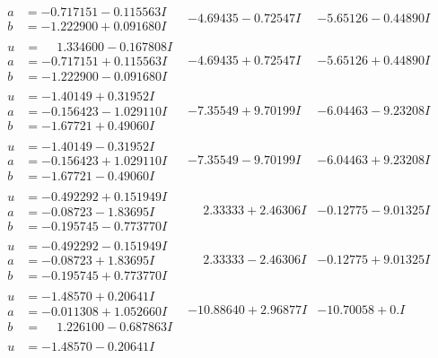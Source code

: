 \documentclass[1p]{elsarticle_modified}
\theoremstyle{definition}
\begin{document}
$$\begin{array}{c|c|c}
\begin{aligned}
a &= -0.717151 - 0.115563 I \\
b &= -1.222900 + 0.091680 I\end{aligned}
 & -4.69435 - 0.72547 I & -5.65126 - 0.44890 I \\ \hline\begin{aligned}
u &= \phantom{-}1.334600 - 0.167808 I \\
a &= -0.717151 + 0.115563 I \\
b &= -1.222900 - 0.091680 I\end{aligned}
 & -4.69435 + 0.72547 I & -5.65126 + 0.44890 I \\ \hline\begin{aligned}
u &= -1.40149 + 0.31952 I \\
a &= -0.156423 - 1.029110 I \\
b &= -1.67721 + 0.49060 I\end{aligned}
 & -7.35549 + 9.70199 I & -6.04463 - 9.23208 I \\ \hline\begin{aligned}
u &= -1.40149 - 0.31952 I \\
a &= -0.156423 + 1.029110 I \\
b &= -1.67721 - 0.49060 I\end{aligned}
 & -7.35549 - 9.70199 I & -6.04463 + 9.23208 I \\ \hline\begin{aligned}
u &= -0.492292 + 0.151949 I \\
a &= -0.08723 - 1.83695 I \\
b &= -0.195745 - 0.773770 I\end{aligned}
 & \phantom{-}2.33333 + 2.46306 I & -0.12775 - 9.01325 I \\ \hline\begin{aligned}
u &= -0.492292 - 0.151949 I \\
a &= -0.08723 + 1.83695 I \\
b &= -0.195745 + 0.773770 I\end{aligned}
 & \phantom{-}2.33333 - 2.46306 I & -0.12775 + 9.01325 I \\ \hline\begin{aligned}
u &= -1.48570 + 0.20641 I \\
a &= -0.011308 + 1.052660 I \\
b &= \phantom{-}1.226100 - 0.687863 I\end{aligned}
 & -10.88640 + 2.96877 I & -10.70058 + 0. I\phantom{ +0.000000I} \\ \hline\begin{aligned}
u &= -1.48570 - 0.20641 I \\

\end{aligned}
\end{array}$$
\end{document}
